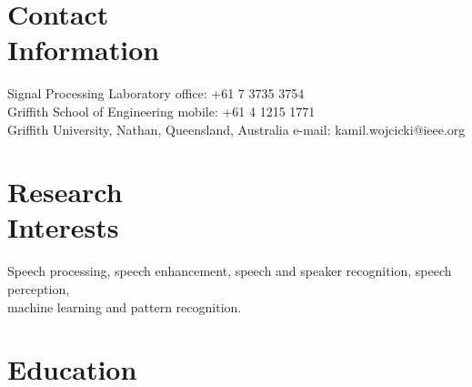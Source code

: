 \documentclass[margin,line]{resume}
\begin{document}
\begin{resume}

    \section{\mysidestyle Contact\\Information}

    Signal Processing Laboratory                            \hfill office: +61 7 3735 3754          \vspace{0mm}\\\vspace{0mm}%
    Griffith School of Engineering                          \hfill mobile: +61 4 1215 1771          \vspace{0mm}\\\vspace{0mm}%
    Griffith University, Nathan, Queensland, Australia      \hfill e-mail: kamil.wojcicki@ieee.org  \vspace{0mm}\\\vspace{-4.5mm}%


    \section{\mysidestyle Research\\Interests}

    Speech processing, speech enhancement, speech and speaker recognition, speech perception, \\ 
    machine learning and pattern recognition.


    \section{\mysidestyle Education}


\end{resume}
\end{document}
